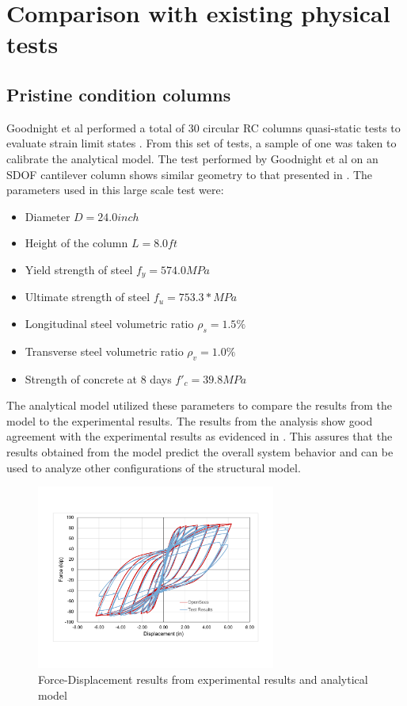 \section{Comparison with existing physical tests}
\subsection{Pristine condition columns}

Goodnight et al performed a total of 30 circular RC columns quasi-static tests to evaluate strain limit states \cite{Goodnight2016}. From this set of tests, a sample of one was taken to calibrate the analytical model. The test performed by Goodnight et al on an SDOF cantilever column shows similar geometry to that presented in . The parameters used in this large scale test were:

\begin{itemize}
	\item Diameter $D = 24.0 inch$
	\item Height of the column $L = 8.0 ft$
	\item Yield strength of steel $f_{y} = 574.0 MPa$
	\item Ultimate strength of steel $f_{u} = 753.3 * MPa$
	\item Longitudinal steel volumetric ratio $\rho_{s} = 1.5\% $
	\item Transverse steel volumetric ratio $\rho_{v} = 1.0\% $
	\item Strength of concrete at 8 days $f'_{c} = 39.8 MPa$
\end{itemize}

The analytical model utilized these parameters to compare the results from the model to the experimental results. The results from the analysis show good agreement with the experimental results as evidenced in . This assures that the results obtained from the model predict the overall system behavior and can be used to analyze other configurations of the structural model.

\begin{figure}[htbp]
	\centering
	\includegraphics[width=0.7\textwidth]{Chapter-4/figs/Model_Calibration_Goodnight2016}
	\caption{Force-Displacement results from experimental results \cite{Goodnight2013} and analytical model}
	\label{fig:ModelCalibration}
\end{figure}
